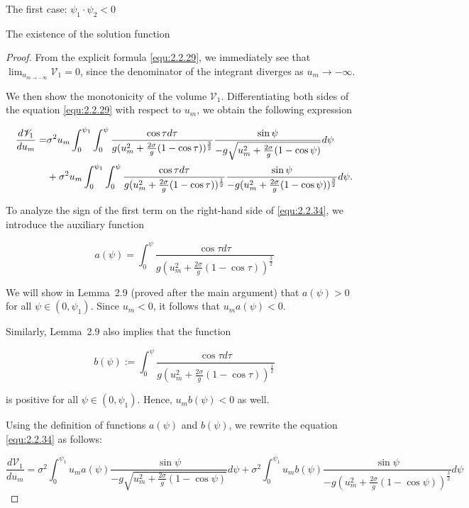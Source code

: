 \documentclass[letterpaper,reqno,10pt,twoside]{amsart}
\theoremstyle{definition}
\theoremstyle{remark}
\begin{document}
\begin{section}{The first case: $\psi_1\cdot \psi_2<0$ }
\begin{subsection}{The existence of the solution function}
\begin{proof}
        From the explicit formula \eqref{equ:2.2.29}, we immediately see that $\lim_{u_{m\rightarrow -\infty}}\mathscr{V}_1=0$, since the denominator of the integrant diverges as $u_{m}\to -\infty$. 

        We then show the monotonicity of the volume $\mathscr{V}_{1}$. Differentiating both sides of the equation \eqref{equ:2.2.29} with respect to $u_{m}$, we obtain the following expression

        \begin{align}
             \frac{d\mathscr{V}_{1}}{du_{m}}=&\sigma^{2} u_{m}\int_{0}^{\psi_1} \int_{0}^{\psi}\frac{\cos\tau d\tau}{g(u_m^{2}+\frac{2\sigma}{g}(1-\cos\tau))^{\frac{3}{2}}}\frac{\sin\psi}{-g\sqrt{u_{m}^{2}+\frac{2\sigma}{g}(1-\cos\psi)}}d\psi\notag\\
             &+\sigma^{2}u_{m}\int_{0}^{\psi_1} \int_{0}^{\psi}\frac{\cos\tau d\tau}{g(u_m^{2}+\frac{2\sigma}{g}(1-\cos\tau))^{\frac{1}{2}}}\frac{\sin\psi}{-g({u_{m}^{2}+\frac{2\sigma}{g}(1-\cos\psi)})^{\frac{3}{2}}}d\psi \label{equ:2.2.34}.
        \end{align}

        To analyze the sign of the first term on the right-hand side of \eqref{equ:2.2.34}, we introduce the auxiliary function

        \begin{equation*}
            a(\psi)=\int_{0}^{\psi} \frac{\cos\tau d\tau}{g(u_{m}^{2}+\frac{2\sigma}{g}(1-\cos\tau))^{\frac{3}{2}}}
        \end{equation*}

       \noindent We will show in Lemma~2.9 (proved after the main argument) that $a(\psi)>0$ for all $\psi\in(0,\psi_{1})$. Since $u_{m}<0$, it follows that $u_{m}a(\psi)<0$. 
       
       Similarly, Lemma~2.9 also implies that the function
        
        \begin{equation*}
            b(\psi):=\int_{0}^{\psi} \frac{\cos\tau d\tau}{g(u_{m}^{2}+\frac{2\sigma}{g}(1-\cos\tau))^{\frac{1}{2}}}
        \end{equation*}

        \noindent is positive for all $\psi\in(0,\psi_{1})$. Hence, $u_{m}b(\psi)<0$ as well.

        Using the definition of functions $a(\psi)$ and $b(\psi)$, we rewrite the equation \eqref{equ:2.2.34} as follows:

        \begin{equation*}
            \frac{d\mathscr{V}_{1}}{du_{m}}=\sigma^{2}\int_{0}^{\psi_1}u_{m}a(\psi)\frac{\sin\psi}{-g\sqrt{u_{m}^{2}+\frac{2\sigma}{g}(1-\cos\psi)}}d\psi+\sigma^{2}\int_{0}^{\psi_1} u_{m}b(\psi) \frac{\sin\psi}{-g(u_{m}^{2}+\frac{2\sigma}{g}(1-\cos\psi))^{\frac{3}{2}}}d\psi
        \end{equation*}


\end{proof}
\end{subsection}
\end{section}
\end{document}
